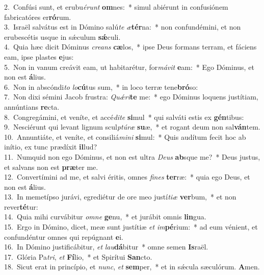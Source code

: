 {2.~}Confúsi sunt, et erubu\textit{é}\textit{runt} \textbf{om}nes:~* simul abiérunt in confusiónem fabricatóres er\textbf{ró}rum.\\
{3.~}Israël salvátus est in Dómino salú\textit{te} \textit{æ}\textbf{tér}na:~* non confundémini, et non erubescétis usque in sǽculum \textbf{sǽ}culi.\\
{4.~}Quia hæc dicit Dóminus \textit{cre}\textit{ans} \textbf{cæ}los,~* ipse Deus formans terram, et fáciens eam, ipse plastes \textbf{e}jus:\\
{5.~}Non in vanum creávit eam, ut habitarétur, for\textit{má}\textit{vit} \textbf{e}am:~* Ego Dóminus, et non est \textbf{á}lius.\\
{6.~}Non in abscóndi\textit{to} \textit{lo}\textbf{cú}tus sum,~* in loco terræ tene\textbf{bró}so:\\
{7.~}Non dixi sémini Jacob frustra: \textit{Quǽ}\textit{ri}\textbf{te} me:~* ego Dóminus loquens justítiam, annúntians \textbf{re}cta.\\
{8.~}Congregámini, et veníte, et accé\textit{di}\textit{te} \textbf{si}mul~* qui salváti estis ex \textbf{gén}tibus:\\
{9.~}Nesciérunt qui levant lignum scul\textit{ptú}\textit{ræ} \textbf{su}æ,~* et rogant deum non sal\textbf{ván}tem.\\
{10.~}Annuntiáte, et veníte, et consiliá\textit{mi}\textit{ni} \textbf{si}mul:~* Quis audítum fecit hoc ab inítio, ex tunc prædíxit \textbf{il}lud?\\
{11.~}Numquid non ego Dóminus, et non est ultra \textit{De}\textit{us} \textbf{ab}sque me?~* Deus justus, et salvans non est \textbf{præ}ter me.\\
{12.~}Convertímini ad me, et salvi éritis, omnes \textit{fi}\textit{nes} \textbf{ter}ræ:~* quia ego Deus, et non est \textbf{á}lius.\\
{13.~}In memetípso jurávi, egrediétur de ore meo justí\textit{ti}\textit{æ} \textbf{ver}bum,~* et non rever\textbf{té}tur:\\
{14.~}Quia mihi curvábitur \textit{om}\textit{ne} \textbf{ge}nu,~* et jurábit omnis \textbf{lin}gua.\\
{15.~}Ergo in Dómino, dicet, meæ sunt justítiæ \textit{et} \textit{im}\textbf{pé}rium:~* ad eum vénient, et confundéntur omnes qui repúgnant \textbf{e}i.\\
{16.~}In Dómino justificábitur, \textit{et} \textit{lau}\textbf{dá}bitur~* omne semen \textbf{Is}raël.\\
{17.~}Glória Pa\textit{tri}, \textit{et} \textbf{Fí}lio,~* et Spirítui \textbf{San}cto.\\
{18.~}Sicut erat in princípio, et \textit{nunc}, \textit{et} \textbf{sem}per,~* et in sǽcula sæculórum. \textbf{A}men.\\

